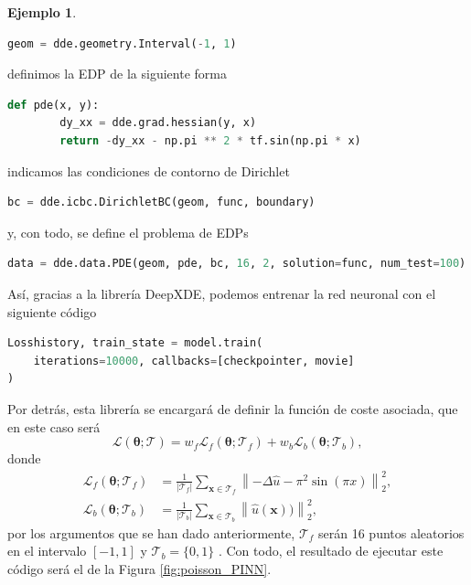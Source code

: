 \documentclass[a4paper,11pt,spanish, twoside, leqno]{tfg-uam}
\theoremstyle{definition}
\newtheorem{exmp}[teor]{Ejemplo}
\begin{document}
\begin{mdframed}
\begin{exmp}
\begin{lstlisting}[language=Python]
    geom = dde.geometry.Interval(-1, 1)
\end{lstlisting}
        definimos la EDP de la siguiente forma
\begin{lstlisting}[language=Python]
    def pde(x, y):
        dy_xx = dde.grad.hessian(y, x)
        return -dy_xx - np.pi ** 2 * tf.sin(np.pi * x)
\end{lstlisting}
    indicamos las condiciones de contorno de Dirichlet
\begin{lstlisting}[language=Python]
    bc = dde.icbc.DirichletBC(geom, func, boundary)
\end{lstlisting}
y, con todo, se define el problema de EDPs
\begin{lstlisting}[language=Python]
   data = dde.data.PDE(geom, pde, bc, 16, 2, solution=func, num_test=100)
\end{lstlisting}
    Así, gracias a la librería DeepXDE, podemos entrenar la red neuronal con el siguiente código
\begin{lstlisting}[language=Python]
Losshistory, train_state = model.train(
    iterations=10000, callbacks=[checkpointer, movie]
)
\end{lstlisting}
    Por detrás, esta librería se encargará de definir la función de coste asociada, que en este caso será
    \begin{equation*} 
        \mathcal{L}(\boldsymbol{\theta}; \mathcal{T}) = w_f \mathcal{L}_f(\boldsymbol{\theta}; \mathcal{T}_f) + w_b \mathcal{L}_b(\boldsymbol{\theta}; \mathcal{T}_b),
    \end{equation*}
    donde
    \begin{align*}
        \mathcal{L}_f(\boldsymbol{\theta}; \mathcal{T}_f) &= \frac{1}{|\mathcal{T}_f|} \sum_{\mathbf{x} \in \mathcal{T}_f} \left\| -\Delta \hat{u} - \pi^2 \sin(\pi x)\right\|_2^2, \\ 
        \mathcal{L}_b(\boldsymbol{\theta}; \mathcal{T}_b) &= \frac{1}{|\mathcal{T}_b|} \sum_{\mathbf{x} \in \mathcal{T}_b} \left\| \hat{u} (\mathbf{x}))\right\|_2^2,
    \end{align*}
    por los argumentos que se han dado anteriormente, $\mathcal{T}_f$ serán 16 puntos aleatorios en el intervalo $[-1,1]$ y $\mathcal{T}_b = \{0,1\}$ . Con todo, el resultado de ejecutar este código será el de la Figura \ref{fig:poisson_PINN}.


\end{exmp}
\end{mdframed}
\end{document}
